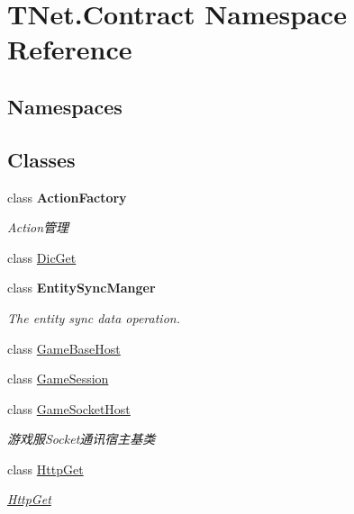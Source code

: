 \hypertarget{namespace_t_net_1_1_contract}{}\section{T\+Net.\+Contract Namespace Reference}
\label{namespace_t_net_1_1_contract}
\subsection*{Namespaces}
\begin{DoxyCompactItemize}
\end{DoxyCompactItemize}
\subsection*{Classes}
\begin{DoxyCompactItemize}
\item 
class {\bfseries Action\+Factory}
\begin{DoxyCompactList}\small\item\em Action管理 \end{DoxyCompactList}\item 
class \mbox{\hyperlink{class_t_net_1_1_contract_1_1_dic_get}{Dic\+Get}}
\item 
class {\bfseries Entity\+Sync\+Manger}
\begin{DoxyCompactList}\small\item\em The entity sync data operation. \end{DoxyCompactList}\item 
class \mbox{\hyperlink{class_t_net_1_1_contract_1_1_game_base_host}{Game\+Base\+Host}}
\item 
class \mbox{\hyperlink{class_t_net_1_1_contract_1_1_game_session}{Game\+Session}}
\item 
class \mbox{\hyperlink{class_t_net_1_1_contract_1_1_game_socket_host}{Game\+Socket\+Host}}
\begin{DoxyCompactList}\small\item\em 游戏服\+Socket通讯宿主基类 \end{DoxyCompactList}\item 
class \mbox{\hyperlink{class_t_net_1_1_contract_1_1_http_get}{Http\+Get}}
\begin{DoxyCompactList}\small\item\em \mbox{\hyperlink{class_t_net_1_1_contract_1_1_http_get}{Http\+Get}} \end{DoxyCompactList}\item 

\end{DoxyCompactItemize}
